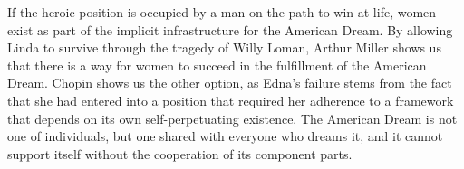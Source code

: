 If the heroic position is occupied by a man on the path to win at
life, women exist as part of the implicit infrastructure for the American
Dream. By allowing Linda to survive through the tragedy of Willy Loman, Arthur
Miller shows us that there is a way for women to succeed in the fulfillment of
the American Dream. Chopin shows us the other option, as
Edna's failure stems from the fact that she had entered into a position that
required her adherence to a framework that depends on its own
self-perpetuating existence. The American Dream is not one of individuals, but
one shared with everyone who dreams it, and it cannot support itself without
the cooperation of its component parts.
